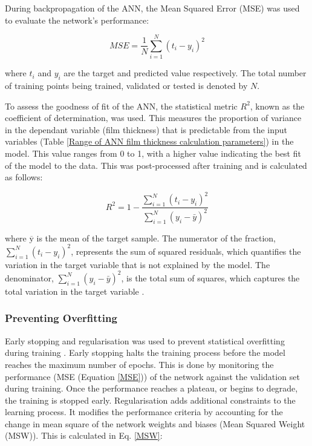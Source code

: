 During backpropagation of the ANN, the Mean Squared Error (MSE) was used to evaluate the network's performance:

\begin{equation}\label{MSE}
	M S E=\frac{1}{N} \sum_{i=1}^N\left(t_i-y_i\right)^2
\end{equation}

where $t_i$ and $y_i$ are the target and predicted value respectively. The total number of training points being trained, validated or tested is denoted by $N$. 

To assess the goodness of fit of the ANN, the statistical metric $R^2$, known as the coefficient of determination, was used. This measures the proportion of variance in the dependant variable (film thickness) that is predictable from the input variables (Table \ref{Range of ANN film thickness calculation parameters}) in the model. This value ranges from 0 to 1, with a higher value indicating the best fit of the model to the data. This was post-processed after training and is calculated as follows:

\begin{equation}\label{R-squared}
	R^2=1-\frac{\sum_{i=1}^N\left(t_i-y_i\right)^2}{\sum_{i=1}^N\left(y_i-\bar{y}\right)^2}
\end{equation}

 where $\overline{\mathrm{y}}$ is the mean of the target sample. The numerator of the fraction, \( \sum_{i=1}^N(t_i - y_i)^2 \), represents the sum of squared residuals, which quantifies the variation in the target variable that is not explained by the model. The denominator, \( \sum_{i=1}^N(y_i - \bar{y})^2 \), is the total sum of squares, which captures the total variation in the target variable \cite{Marian2022}.

\subsubsection{Preventing Overfitting}

Early stopping and regularisation was used to prevent statistical overfitting during training \cite{MatlabOverfit}. Early stopping halts the training process before the model reaches the maximum number of epochs. This is done by monitoring the performance (MSE (Equation \ref{MSE})) of the network against the validation set during training. Once the performance reaches a plateau, or begins to degrade, the training is stopped early. Regularisation adds additional constraints to the learning process. It modifies the performance criteria by accounting for the change in mean square of the network weights and biases (Mean Squared Weight (MSW)). This is calculated in Eq. \ref{MSW}: 

